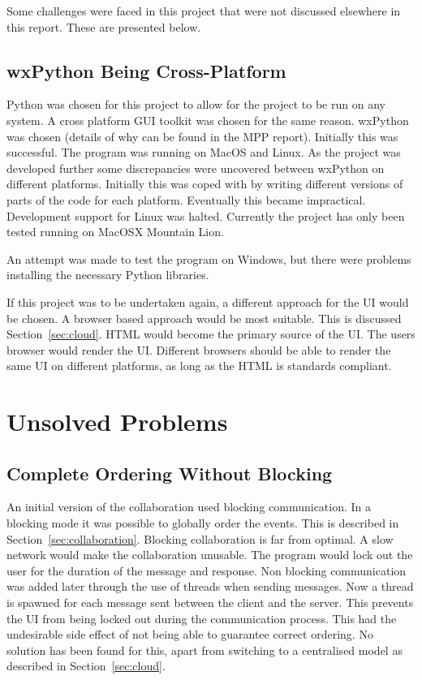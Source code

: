 Some challenges were faced in this project that were not discussed elsewhere in this report.  These are presented below.

\subsection{wxPython Being Cross-Platform}
Python was chosen for this project to allow for the project to be run on any system.  A cross platform \ac{GUI} toolkit was chosen for the same reason.  wxPython was chosen (details of why can be found in the MPP report).  Initially this was successful.  The program was running on MacOS and Linux.  As the project was developed further some discrepancies were uncovered between wxPython on different platforms.  Initially this was coped with by writing different versions of parts of the code for each platform.  Eventually this became impractical.  Development support for Linux was halted.  Currently the project has only been tested running on MacOSX Mountain Lion.

An attempt was made to test the program on Windows, but there were problems installing the necessary Python libraries.

If this project was to be undertaken again, a different approach for the \ac{UI} would be chosen.  A browser based approach would be most suitable.  This is discussed Section~\ref{sec:cloud}.  HTML would become the primary source of the \ac{UI}.  The users browser would render the \ac{UI}.  Different browsers should be able to render the same \ac{UI} on different platforms, as long as the HTML is standards compliant.

\section{Unsolved Problems}

\subsection{Complete Ordering Without Blocking}

An initial version of the collaboration used blocking communication.  In a blocking mode it was possible to globally order the events.  This is described in Section~\ref{sec:collaboration}.  Blocking collaboration is far from optimal.  A slow network would make the collaboration unusable.  The program would lock out the user for the duration of the message and response.  Non blocking communication was added later through the use of threads when sending messages.  Now a thread is spawned for each message sent between the client and the server.  This prevents the \ac{UI} from being locked out during the communication process.  This had the undesirable side effect of not being able to guarantee correct ordering.  No solution has been found for this, apart from switching to a centralised model as described in Section~\ref{sec:cloud}.

